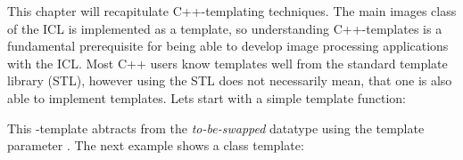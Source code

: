 This chapter will recapitulate C++-templating techniques. The main images class  of the ICL is implemented as a template, so understanding C++-templates is a fundamental prerequisite for being able to develop image processing applications with the ICL. Most C++ users know templates well from the standard template library (STL), however using the STL does not necessarily mean, that one is also able to implement templates. Lets start with a simple template function:


This -template abtracts from the \emph{to-be-swapped} datatype using the template parameter . The next example shows a class template:


